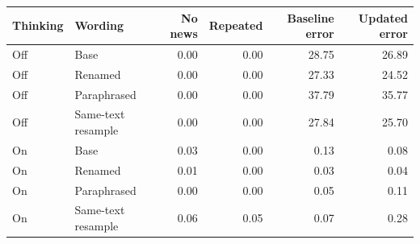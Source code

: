 \begin{tabular}{llrrrr}
\toprule
Thinking & Wording & No news & Repeated & Baseline error & Updated error \\
\midrule
Off & Base & 0.00 & 0.00 & 28.75 & 26.89 \\
Off & Renamed & 0.00 & 0.00 & 27.33 & 24.52 \\
Off & Paraphrased & 0.00 & 0.00 & 37.79 & 35.77 \\
Off & Same-text resample & 0.00 & 0.00 & 27.84 & 25.70 \\
On & Base & 0.03 & 0.00 & 0.13 & 0.08 \\
On & Renamed & 0.01 & 0.00 & 0.03 & 0.04 \\
On & Paraphrased & 0.00 & 0.00 & 0.05 & 0.11 \\
On & Same-text resample & 0.06 & 0.05 & 0.07 & 0.28 \\
\bottomrule
\end{tabular}
